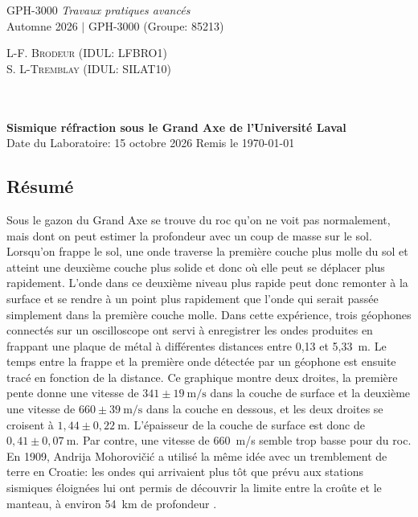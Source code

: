 \documentclass[11pt,letterpaper]{article}
\begin{document}
\thispagestyle{empty} %
\begin{center}

\noindent
\begin{minipage}[t]{0.5\textwidth}
\raggedright
{\large GPH-3000 \textit{Travaux pratiques avancés}}\\
{\large Automne 2026 $\vert$ GPH-3000 (Groupe: 85213)}
\end{minipage}%
\begin{minipage}[t]{0.5\textwidth}
\raggedleft
{\large \textsc{L-F. Brodeur (IDUL: LFBRO1)}}\\
{\large \textsc{S. L-Tremblay (IDUL: SILAT10)}}
\end{minipage}
\\~\\
\vspace{1em}
{\Large \textbf{Sismique réfraction sous le Grand Axe de l'Université Laval} }\\
[0.3em]
{\large Date du Laboratoire: 15 octobre 2026 \qquad\qquad\qquad Remis le \today}

\end{center}

\vspace{0.5em}
\subsection*{Résumé}
Sous le gazon du Grand Axe se trouve du roc qu'on ne voit pas normalement, mais dont on peut estimer la profondeur avec un coup de masse sur le sol. Lorsqu'on frappe le sol, une onde traverse la première couche plus molle du sol et atteint une deuxième couche plus solide et donc où elle peut se déplacer plus rapidement. L'onde dans ce deuxième niveau plus rapide peut donc remonter à la surface et se rendre à un point plus rapidement que l'onde qui serait passée simplement dans la première couche molle. Dans cette expérience, trois géophones connectés sur un oscilloscope ont servi à enregistrer les ondes produites en frappant une plaque de métal à différentes distances entre 0,13 et 5,33~m. Le temps entre la frappe et la première onde détectée par un géophone est ensuite tracé en fonction de la distance. Ce graphique montre deux droites, la première pente donne une vitesse de $341 \pm 19~\text{m/s}$ dans la couche de surface et la deuxième une vitesse de $660 \pm 39~\text{m/s}$ dans la couche en dessous, et les deux droites se croisent à $1{,}44 \pm 0{,}22~\text{m}$. L'épaisseur de la couche de surface est donc de $0{,}41 \pm 0{,}07~\text{m}$. Par contre, une vitesse de 660~m/s semble trop basse pour du roc. En 1909, Andrija Mohorovičić a utilisé la même idée avec un tremblement de terre en Croatie: les ondes qui arrivaient plus tôt que prévu aux stations sismiques éloignées lui ont permis de découvrir la limite entre la croûte et le manteau, à environ 54~km de profondeur \cite{herak}.
\end{document}
